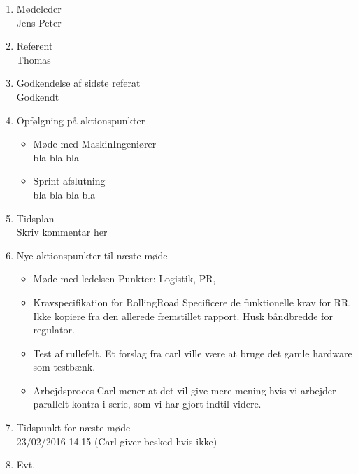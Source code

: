 	\begin{enumerate}
		\itemsep 0.3em 
		\item Mødeleder\\
			Jens-Peter
		\item Referent\\
			Thomas
		\item Godkendelse af sidste referat\\
			Godkendt
			
		\item Opfølgning på aktionspunkter
		\begin{itemize}
			\itemsep 0.3em 
			\item Møde med MaskinIngeniører\\
				bla bla bla
			\item Sprint afslutning\\
				bla bla bla bla
		\end{itemize}
		\item Tidsplan\\
			Skriv kommentar her
		\item Nye aktionspunkter til næste møde
		\begin{itemize}
			\itemsep 0.3em 
		\item Møde med ledelsen
			Punkter: Logistik, PR,
		\item Kravspecifikation for RollingRoad
			 Specificere de funktionelle krav for RR.
			 Ikke kopiere fra den allerede fremstillet rapport.
			 Husk båndbredde for regulator.
		\item Test af rullefelt.
			 Et forslag fra carl ville være at bruge det gamle hardware som testbænk.
		\item Arbejdsproces
			Carl mener at det vil give mere mening hvis vi arbejder parallelt kontra i serie, som vi har gjort indtil videre.
		\end{itemize}
		\item Tidspunkt for næste møde\\
			23/02/2016 14.15 (Carl giver besked hvis ikke)
		\item Evt.
	\end{enumerate}

